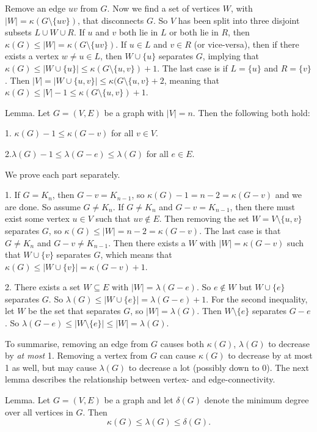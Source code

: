 \proof Remove an edge $uv$ from $G$. Now we find a set of vertices $W$, with $|W| = \kappa(G\setminus\{uv\})$, that disconnects $G$. So $V$ has been split into three disjoint subsets $L\cup W\cup R$. If $u$ and $v$ both lie in $L$ or both lie in $R$, then $\kappa(G) \leq |W| = \kappa(G\setminus\{uv\})$. If $u\in L$ and $v\in R$ (or vice-versa), then if there exists a vertex $w\neq u\in L$, then $W\cup \{u\}$ separates $G$, implying that $\kappa(G)\leq |W\cup \{u\}|\leq \kappa(G\setminus\{u,v\}) + 1$. The last case is if $L = \{u\}$ and $R=\{v\}$. Then $|V| = |W\cup\{u,v\}|\leq \kappa(G\setminus\{u,v\} + 2$, meaning that $\kappa(G)\leq |V|-1 \leq \kappa(G\setminus\{u,v\})+1$. \slug

\proclaim Lemma. Let $G=(V,E)$ be a graph with $|V|=n$. Then the following both hold:
\medskip
\item {1.} $\kappa(G) - 1 \leq \kappa(G-v)$ for all $v\in V$.
\smallskip
\item {2.}$\lambda(G) - 1 \leq \lambda(G-e)\leq \lambda(G)$ for all $e\in E$.
\medskip

\proof We prove each part separately.
\medskip
\item {1.} If $G = K_n$, then $G-v=K_{n-1}$, so $\kappa(G) - 1 = n-2 = \kappa(G-v)$ and we are done. So assume $G\neq K_n$. If $G\neq K_n$ and $G-v = K_{n-1}$, then there must exist some vertex $u\in V$ such that $uv\notin E$. Then removing the set $W = V\setminus\{u,v\}$ separates $G$, so $\kappa(G) \leq |W| = n-2 = \kappa(G-v)$. The last case is that $G\neq K_n$ and $G-v \neq K_{n-1}$. Then there exists a $W$ with $|W|=\kappa(G-v)$ such that $W\cup \{v\}$ separates $G$, which means that $\kappa(G) \leq |W\cup\{v\}| = \kappa(G-v)+1$.
\smallskip
\item {2.} There exists a set $W\subseteq E$ with $|W| = \lambda(G-e)$. So $e\notin W$ but $W\cup\{e\}$ separates $G$. So $\lambda(G) \leq |W\cup\{e\}| = \lambda(G-e) + 1$. For the second inequality, let $W$ be the set that separates $G$, so $|W|=\lambda(G)$. Then $W\setminus\{e\}$ separates $G-e$. So $\lambda(G-e) \leq |W\setminus\{e\}|\leq |W|=\lambda(G)$.\slug

To summarise, removing an edge from $G$ causes both $\kappa(G)$, $\lambda(G)$ to decrease by {\it at most} 1. Removing a vertex from $G$ can cause $\kappa(G)$ to decrease by at most 1 as well, but may cause $\lambda(G)$ to decrease a lot (possibly down to 0). The next lemma describes the relationship between vertex- and edge-connectivity.

\proclaim Lemma. Let $G=(V,E)$ be a graph and let $\delta(G)$ denote the minimum degree over all vertices in $G$. Then
$$ \kappa(G) \leq \lambda(G) \leq \delta(G).$$

